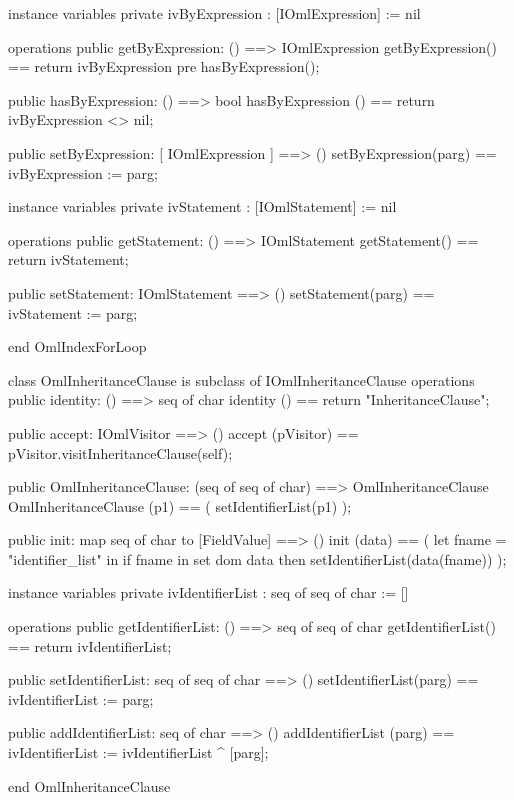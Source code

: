\begin{vdm_al}
instance variables
  private ivByExpression : [IOmlExpression] := nil

operations
  public getByExpression: () ==> IOmlExpression
  getByExpression() == return ivByExpression
    pre hasByExpression();

  public hasByExpression: () ==> bool
  hasByExpression () == return ivByExpression <> nil;

  public setByExpression: [ IOmlExpression ] ==> ()
  setByExpression(parg) == ivByExpression := parg;

instance variables
  private ivStatement : [IOmlStatement] := nil

operations
  public getStatement: () ==> IOmlStatement
  getStatement() == return ivStatement;

  public setStatement: IOmlStatement ==> ()
  setStatement(parg) == ivStatement := parg;

end OmlIndexForLoop
\end{vdm_al}

\begin{vdm_al}
class OmlInheritanceClause is subclass of IOmlInheritanceClause
operations
  public identity: () ==> seq of char
  identity () == return "InheritanceClause";

  public accept: IOmlVisitor ==> ()
  accept (pVisitor) == pVisitor.visitInheritanceClause(self);

  public OmlInheritanceClause:
      (seq of seq of char) ==> OmlInheritanceClause
  OmlInheritanceClause (p1) == 
   ( setIdentifierList(p1) );

  public init: map seq of char to [FieldValue] ==> ()
  init (data) ==
    ( let fname = "identifier_list" in
        if fname in set dom data
        then setIdentifierList(data(fname)) );

instance variables
  private ivIdentifierList : seq of seq of char := []

operations
  public getIdentifierList: () ==> seq of seq of char
  getIdentifierList() == return ivIdentifierList;

  public setIdentifierList: seq of seq of char ==> ()
  setIdentifierList(parg) == ivIdentifierList := parg;

  public addIdentifierList: seq of char ==> ()
  addIdentifierList (parg) == ivIdentifierList := ivIdentifierList ^ [parg];

end OmlInheritanceClause
\end{vdm_al}

